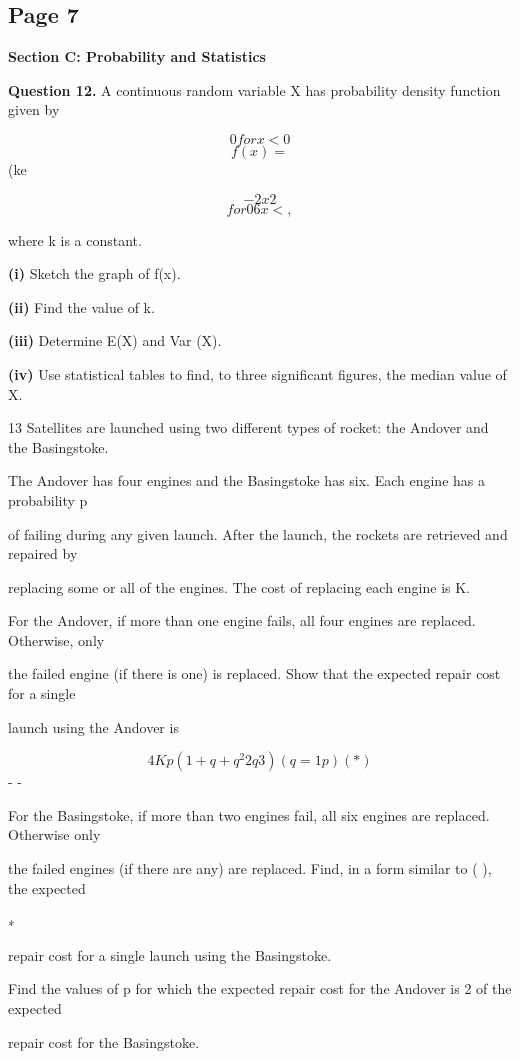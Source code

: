 \documentclass[12pt]{article}
\begin{document}
\subsection*{Page 7}
\begin{flushleft}
\bigskip\textbf{Section C: Probability and Statistics}\par
\bigskip\textbf{Question 12.} A continuous random variable X has probability density function given by\par
\[0 for x < 0\]
\[f(x) =\]
(ke\par
\[-2x2\]
\[for 0 6 x < ,\]
\infty\par
where k is a constant.\par
\textbf{(i)} Sketch the graph of f(x).\par
\textbf{(ii)} Find the value of k.\par
\textbf{(iii)} Determine E(X) and Var (X).\par
\textbf{(iv)} Use statistical tables to find, to three significant figures, the median value of X.\par
13 Satellites are launched using two different types of rocket: the Andover and the Basingstoke.\par
The Andover has four engines and the Basingstoke has six. Each engine has a probability p\par
of failing during any given launch. After the launch, the rockets are retrieved and repaired by\par
replacing some or all of the engines. The cost of replacing each engine is K.\par
For the Andover, if more than one engine fails, all four engines are replaced. Otherwise, only\par
the failed engine (if there is one) is replaced. Show that the expected repair cost for a single\par
launch using the Andover is\par
\[4Kp(1 + q + q^2 2q3) (q = 1 p) (*)\]
- -\par
For the Basingstoke, if more than two engines fail, all six engines are replaced. Otherwise only\par
the failed engines (if there are any) are replaced. Find, in a form similar to ( ), the expected\par
∗\par
repair cost for a single launch using the Basingstoke.\par
Find the values of p for which the expected repair cost for the Andover is 2 of the expected\par
repair cost for the Basingstoke.\par
\end{flushleft}
\end{document}

